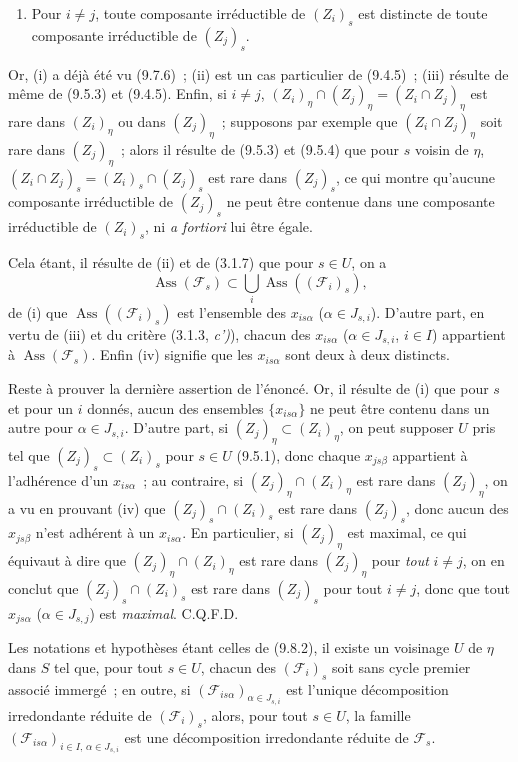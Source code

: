 
\begin{enumerate}[label=\emph{(\roman*)}]
  \item[(iv)] Pour $i\neq j$, toute composante irréductible de $(Z_i)_s$ est
  distincte de toute composante irréductible de $(Z_j)_s$.
\end{enumerate}
Or, (i) a déjà été vu (9.7.6)~; (ii) est un cas particulier de (9.4.5)~; (iii)
résulte de même de (9.5.3) et (9.4.5). Enfin, si $i\neq j$,
$(Z_i)_\eta\cap(Z_j)_\eta=(Z_i\cap Z_j)_\eta$ est rare dans $(Z_i)_\eta$ ou
dans $(Z_j)_\eta$~; supposons par exemple que $(Z_i\cap Z_j)_\eta$ soit rare
dans $(Z_j)_\eta$~; alors il résulte de (9.5.3) et (9.5.4) que pour $s$ voisin
de $\eta$, $(Z_i\cap Z_j)_s=(Z_i)_s\cap(Z_j)_s$ est rare dans $(Z_j)_s$, ce qui
montre qu'aucune composante irréductible de $(Z_j)_s$ ne peut être contenue
dans une composante irréductible de $(Z_i)_s$, ni \emph{a fortiori} lui être
égale.

Cela étant, il résulte de (ii) et de (3.1.7) que pour $s\in U$, on a
\[
\operatorname{Ass}(\mathcal F_s)\subset
\bigcup_i\operatorname{Ass}((\mathcal F_i)_s),
\]
de (i) que $\operatorname{Ass}((\mathcal F_i)_s)$ est l'ensemble des
$x_{is\alpha}$ ($\alpha\in J_{s,i}$). D'autre part, en vertu de (iii) et du
critère (3.1.3, \emph{c')}), chacun des $x_{is\alpha}$ ($\alpha\in J_{s,i}$,
$i\in I$) appartient à $\operatorname{Ass}(\mathcal F_s)$. Enfin (iv) signifie
que les $x_{is\alpha}$ sont deux à deux distincts.

Reste à prouver la dernière assertion de l'énoncé. Or, il résulte de (i) que
pour $s$ et pour un $i$ donnés, aucun des ensembles $\{x_{is\alpha}\}$ ne peut
être contenu dans un autre pour $\alpha\in J_{s,i}$. D'autre part, si
$(Z_j)_\eta\subset(Z_i)_\eta$, on peut supposer $U$ pris tel que
$(Z_j)_s\subset(Z_i)_s$ pour $s\in U$ (9.5.1), donc chaque $x_{js\beta}$
appartient à l'adhérence d'un $x_{is\alpha}$~; au contraire, si
$(Z_j)_\eta\cap(Z_i)_\eta$ est rare dans $(Z_j)_\eta$, on a vu en prouvant (iv)
que $(Z_j)_s\cap(Z_i)_s$ est rare dans $(Z_j)_s$, donc aucun des $x_{js\beta}$
n'est adhérent à un $x_{is\alpha}$. En particulier, si $(Z_j)_\eta$ est
maximal, ce qui équivaut à dire que $(Z_j)_\eta\cap(Z_i)_\eta$ est rare dans
$(Z_j)_\eta$ pour \emph{tout} $i\neq j$, on en conclut que
$(Z_j)_s\cap(Z_i)_s$ est rare dans $(Z_j)_s$ pour tout $i\neq j$, donc que tout
$x_{js\alpha}$ ($\alpha\in J_{s,j}$) est \emph{maximal}. C.Q.F.D.

\begin{corollary}[9.8.4]
\label{IV.9.8.4-fr}
Les notations et hypothèses étant celles de (9.8.2), il existe un voisinage $U$
de $\eta$ dans $S$ tel que, pour tout $s\in U$, chacun des $(\mathcal F_i)_s$
soit sans cycle premier associé immergé~; en outre, si
$(\mathcal F_{is\alpha})_{\alpha\in J_{s,i}}$ est l'unique décomposition
irredondante réduite de $(\mathcal F_i)_s$, alors, pour tout $s\in U$, la
famille $(\mathcal F_{is\alpha})_{i\in I,\,\alpha\in J_{s,i}}$ est une
décomposition irredondante réduite de $\mathcal F_s$.
\end{corollary}

